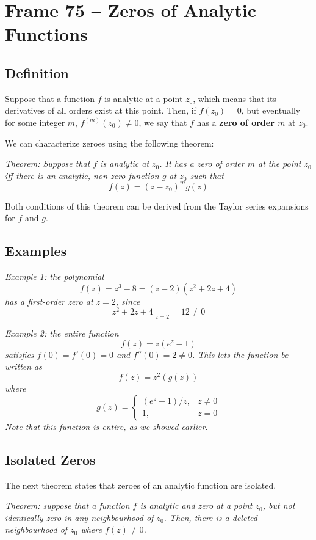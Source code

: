\documentclass{article}
\renewcommand{\emph}{\textbf}
\begin{document}
\clearpage
\section{Frame 75 -- Zeros of Analytic Functions}
\subsection{Definition}
Suppose that a function $f$ is analytic at a point $z_0$, which means that its derivatives of all orders exist at this point. Then, if $f(z_0) = 0$, but eventually for some integer $m$, $f^{(m)}(z_0) \neq 0$, we say that $f$ has a \emph{zero of order $m$} at $z_0$.

We can characterize zeroes using the following theorem:

\textit{Theorem: Suppose that $f$ is analytic at $z_0$. It has a zero of order $m$ at the point $z_0$ iff there is an analytic, non-zero function $g$ at $z_0$ such that
\[
	f(z) = (z - z_0)^m g(z)
\]}

Both conditions of this theorem can be derived from the Taylor series expansions for $f$ and $g$.

\subsection{Examples}
\textit{Example 1: the polynomial
\[
	f(z) = z^3 - 8 = (z - 2)(z^2 + 2z + 4)
\]
has a first-order zero at $z = 2$, since
\[
	z^2 + 2z + 4 \Big|_{z = 2} = 12 \neq 0
\]}

\textit{Example 2: the entire function
\[
	f(z) = z(e^z - 1)
\]
satisfies $f(0) = f'(0) = 0$ and $f''(0) = 2 \neq 0$. This lets the function be written as
\[
	f(z) = z^2 \left( g(z) \right)
\]
where
\[
	g(z) = \begin{cases}
		(e^z - 1) / z,	& z \neq 0 \\
		1,				& z = 0
	\end{cases}
\]
Note that this function is entire, as we showed earlier.}

\subsection{Isolated Zeros}
The next theorem states that zeroes of an analytic function are isolated.

\textit{Theorem: suppose that a function $f$ is analytic and zero at a point $z_0$, but not identically zero in any neighbourhood of $z_0$. Then, there is a deleted neighbourhood of $z_0$ where $f(z) \neq 0$.}
\end{document}
